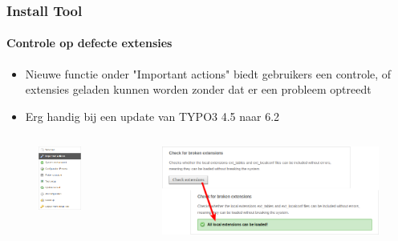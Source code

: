 \begin{frame}[fragile]
	\frametitle{Install Tool}
	\framesubtitle{Controle op defecte extensies}

	\begin{itemize}
		\item Nieuwe functie onder "Important actions" biedt gebruikers een controle,\newline
			of extensies geladen kunnen worden zonder dat er een probleem optreedt
		\item Erg handig bij een update van TYPO3 4.5 naar 6.2
	\end{itemize}

	\begin{columns}[T]
		\begin{column}{.3\textwidth}
			\begin{figure}\vspace*{-0.4cm}
				\includegraphics[width=0.7\linewidth]{Images/InstallTool/ImportantActions.png}
			\end{figure}
		\end{column}
		\begin{column}{.7\textwidth}
			\begin{figure}\vspace*{-0.4cm}
				\includegraphics[width=1\linewidth]{Images/InstallTool/CheckForBrokenExtensions.png}

\end{figure}
\end{column}
\end{columns}
\end{frame}
